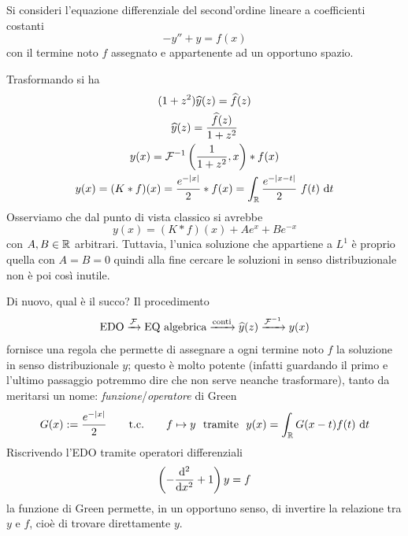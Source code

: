 \begin{exa}
Si consideri l'equazione differenziale del second'ordine lineare a coefficienti costanti
\begin{equation*}
-y''+y=f(x)
\end{equation*}
con il termine noto $f$ assegnato e appartenente ad un opportuno spazio.

Trasformando si ha
\begin{gather*}
(1+z^2)\hat{y}(z)=\hat{f}(z)\\
\hat{y}(z)=\frac{\hat{f}(z)}{1+z^2} \\
y(x)=\Fc^{-1}\left(\frac{1}{1+z^2},x\right)*f(x) \\
y(x)=(K*f)(x)=\frac{e^{-|x|}}{2}*f(x)=\int_\RR \frac{e^{-|x-t|}}{2}\ f(t)\dt
\end{gather*}
Osserviamo che dal punto di vista classico si avrebbe
\begin{equation*}
y(x)=(K*f)(x)+Ae^x+Be^{-x}
\end{equation*}
con $A,B\in\mathbb{R}$ arbitrari. Tuttavia, l'unica soluzione che appartiene a $L^1$ è proprio quella con $A=B=0$ quindi alla fine cercare le soluzioni in senso distribuzionale non è poi così inutile.
\end{exa}
Di nuovo, qual è il succo? Il procedimento
\begin{equation*}
\text{EDO}\xrightarrow[]{\mathcal{F}}\text{EQ algebrica}\xrightarrow[]{\text{conti}}\widehat{y}(z)\xrightarrow[]{\mathcal{F}^{-1}}  y(x)
\end{equation*}
fornisce una regola che permette di assegnare a ogni termine noto $f$ la soluzione in senso distribuzionale $y$; questo è molto potente (infatti guardando il primo e l'ultimo passaggio potremmo dire che non serve neanche trasformare), tanto da meritarsi un nome: \textit{funzione}/\textit{operatore} di Green
\begin{equation*}
G(x):=\frac{e^{-|x|}}{2}\qquad\text{t.c.}\qquad f\mapsto y\ \text{ tramite }\ y(x)=\int_{\mathbb{R}} G(x-t)f(t)\  \mathrm{d} t
\end{equation*}
Riscrivendo l'EDO tramite operatori differenziali
\begin{equation*}
\left(-\frac{\mathrm{d}^2}{\mathrm{d} x^2}+1\right)y=f
\end{equation*}
la funzione di Green permette, in un opportuno senso, di invertire la relazione tra $y$ e $f$, cioè di trovare direttamente $y$.

